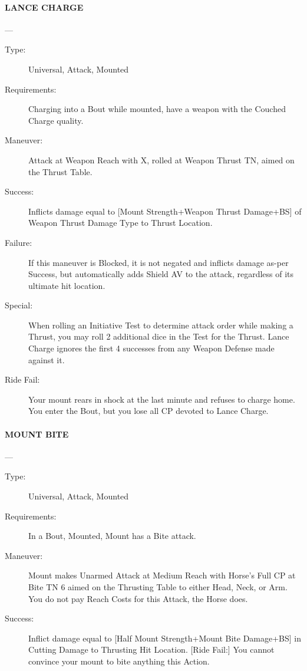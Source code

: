 \documentclass[oneside,11pt,english]{book}
\begin{document}
\paragraph{\large\label{man:LANCE CHARGE} LANCE CHARGE}---
\vspace{-10pt}\begin{description} 
\item [Type:] Universal, Attack, Mounted 
\item [Requirements:] Charging into a Bout while mounted, have a weapon with the Couched Charge quality. 
\item [Maneuver:] Attack at Weapon Reach with X, rolled at Weapon Thrust TN, aimed on the Thrust Table. 
\item [Success:] Inflicts damage equal to [Mount Strength+Weapon Thrust Damage+BS] of Weapon Thrust 
Damage Type to Thrust Location. 
\item [Failure:] If this maneuver is Blocked, it is not negated and inflicts damage as-per Success, but 
automatically adds Shield AV to the attack, regardless of its ultimate hit location. 
\item [Special:] When rolling an Initiative Test to determine attack order while making a Thrust, you may roll 2 
additional dice in the Test for the Thrust. 
Lance Charge ignores the first 4 successes from any Weapon Defense made against it. 
\item [Ride Fail:] Your mount rears in shock at the last minute and refuses to charge home. You enter the Bout, 
but you lose all CP devoted to Lance Charge.
\end{description}

\paragraph{\large\label{man:MOUNT BITE} MOUNT BITE}---
\vspace{-10pt}\begin{description} 
\item [Type:] Universal, Attack, Mounted 
\item [Requirements:] In a Bout, Mounted, Mount has a Bite attack. 
\item [Maneuver:] Mount makes Unarmed Attack at Medium Reach with Horse’s Full CP at Bite TN 6 aimed on 
the Thrusting Table to either Head, Neck, or Arm. You do not pay Reach Costs for this Attack, the Horse 
does. 
\item [Success:] Inflict damage equal to [Half Mount Strength+Mount Bite Damage+BS] in Cutting Damage to 
Thrusting Hit Location. 
[Ride Fail:] You cannot convince your mount to bite anything this Action.
\end{description}
\end{document}
